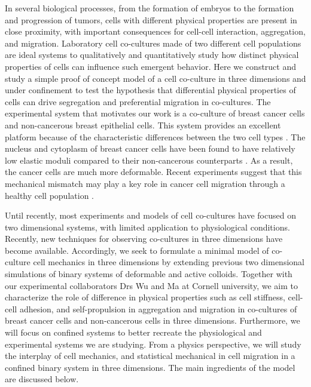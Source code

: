 \documentclass[aps,prb,twocolumn,groupedaddress,nofootinbib,floatfix]{revtex4}
\begin{document}
In several biological processes, from the formation of embryos to the formation and progression of tumors, cells with different physical properties are present in close proximity, with important
consequences for cell-cell interaction, aggregation, and migration. Laboratory cell co-cultures made of two different cell populations are ideal systems to qualitatively and quantitatively 
study how distinct physical properties of cells can influence such emergent behavior. Here we construct and study a simple proof of concept model of a cell co-culture in three dimensions 
and under confinement to test the hypothesis that differential physical properties of cells can drive segregation and preferential migration in co-cultures.   
The experimental system that motivates our work is a co-culture of breast cancer cells and non-cancerous breast epithelial cells. 
This system provides an excellent platform because of the characteristic differences between the two cell types \cite{Lee,Mingming}. 
The nucleus and cytoplasm of breast cancer cells have been found to have relatively low elastic moduli compared to their non-cancerous counterparts \cite{Lee}. 
As a result, the cancer cells are much more deformable. Recent experiments suggest that this mechanical mismatch may play a key role in cancer cell migration through a healthy
cell population \cite{Lee}. 

Until recently, most experiments and models of cell co-cultures have focused on two dimensional systems, with limited application to physiological conditions\cite{Jong}.
Recently, new techniques for observing co-cultures in three dimensions have become available\citep{Alessandri}.
Accordingly, we seek to formulate a minimal model of co-culture cell mechanics in three dimensions by extending previous two dimensional simulations of binary systems of deformable and active colloids\cite{Butcher}.
Together with our experimental collaborators Drs Wu and Ma at Cornell university, we aim to characterize the role of difference in physical properties such as cell stiffness, cell-cell adhesion, and self-propulsion in aggregation and migration in co-cultures of breast cancer cells and non-cancerous cells in three dimensions.
Furthermore, we will focus on confined systems to better recreate the physiological and experimental systems we are studying.
From a physics perspective, we will study the interplay of cell mechanics, and statistical mechanical in cell migration in a confined binary system in three dimensions.
The main ingredients of the model are discussed below.\\
\end{document}
